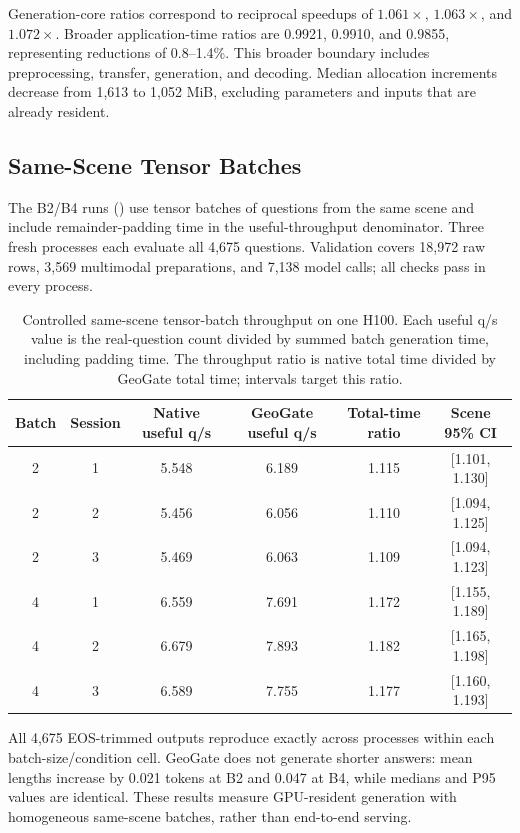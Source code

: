 Generation-core ratios correspond to reciprocal speedups of $1.061\times$, $1.063\times$, and $1.072\times$. Broader application-time ratios are 0.9921, 0.9910, and 0.9855, representing reductions of 0.8--1.4\%. This broader boundary includes preprocessing, transfer, generation, and decoding. Median allocation increments decrease from 1,613 to 1,052 MiB, excluding parameters and inputs that are already resident.

\subsection{Same-Scene Tensor Batches}
The B2/B4 runs () use tensor batches of questions from the same scene and include remainder-padding time in the useful-throughput denominator. Three fresh processes each evaluate all 4,675 questions. Validation covers 18,972 raw rows, 3,569 multimodal preparations, and 7,138 model calls; all checks pass in every process.

\begin{table}[t]
\centering
\caption{Controlled same-scene tensor-batch throughput on one H100. Each useful q/s value is the real-question count divided by summed batch generation time, including padding time. The throughput ratio is native total time divided by GeoGate total time; intervals target this ratio.}
\label{tab:supp_batch}
\begin{tabular}{cccccc}
\toprule
Batch & Session & Native useful q/s & GeoGate useful q/s & Total-time ratio & Scene 95\% CI \\
\midrule
2 & 1 & 5.548 & 6.189 & 1.115 & [1.101, 1.130] \\
2 & 2 & 5.456 & 6.056 & 1.110 & [1.094, 1.125] \\
2 & 3 & 5.469 & 6.063 & 1.109 & [1.094, 1.123] \\
4 & 1 & 6.559 & 7.691 & 1.172 & [1.155, 1.189] \\
4 & 2 & 6.679 & 7.893 & 1.182 & [1.165, 1.198] \\
4 & 3 & 6.589 & 7.755 & 1.177 & [1.160, 1.193] \\
\bottomrule
\end{tabular}
\end{table}

All 4,675 EOS-trimmed outputs reproduce exactly across processes within each batch-size/condition cell. GeoGate does not generate shorter answers: mean lengths increase by 0.021 tokens at B2 and 0.047 at B4, while medians and P95 values are identical. These results measure GPU-resident generation with homogeneous same-scene batches, rather than end-to-end serving.

